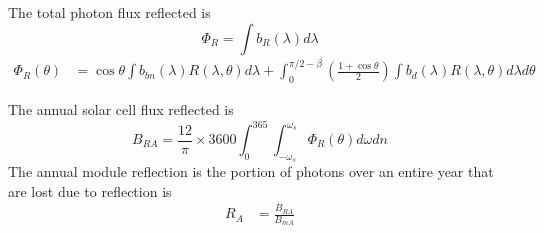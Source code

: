 \documentclass[preprint,12pt]{elsarticle}
\begin{document}
 
The total photon flux reflected is
\begin{equation}
\Phi_{R} = \int b_{R} (\lambda) d \lambda
\end{equation}
\begin{align}
\Phi_{R} (\theta) &= \cos \theta \int b_{bn} (\lambda) R(\lambda, \theta) d \lambda  +  \int_{0}^{\pi/2 - \beta} \left ( \frac{1 + \cos \theta}{2} \right ) \int b_d (\lambda) R(\lambda, \theta) d \lambda d \theta
\end{align}



%

The annual solar cell flux reflected is 
\begin{equation}
B_{RA} = \frac{12}{\pi} \times 3600 \int_{0}^{365} \int_{-\omega_s} ^{\omega_s} \Phi_{R} (\theta) d \omega d n 
\end{equation}
The annual module reflection is the portion of photons over an entire year that are lost due to 
reflection is 
\begin{align}
R_{A} &= \frac{B_{RA}}{B_{mA}} \\
\end{align}


\end{document}
